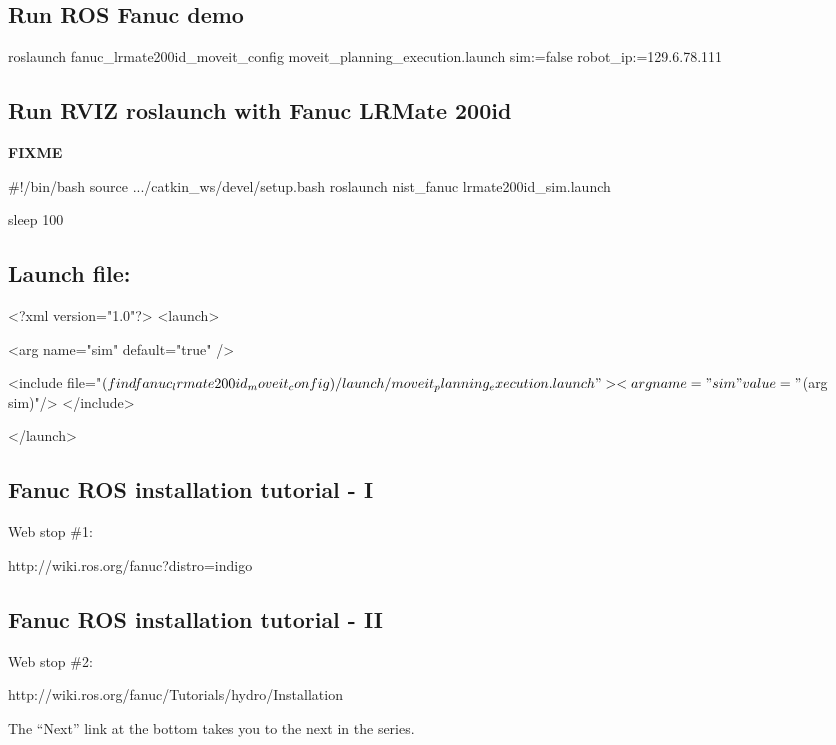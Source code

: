 \subsection*{Run R\-O\-S Fanuc demo }

\begin{DoxyVerb}roslaunch fanuc_lrmate200id_moveit_config  moveit_planning_execution.launch 
    sim:=false   robot_ip:=129.6.78.111
\end{DoxyVerb}


\subsection*{Run R\-V\-I\-Z roslaunch with Fanuc L\-R\-Mate 200id }

{\bfseries F\-I\-X\-M\-E} \begin{DoxyVerb}#!/bin/bash
source .../catkin_ws/devel/setup.bash
roslaunch nist_fanuc lrmate200id_sim.launch

sleep 100
\end{DoxyVerb}


\subsection*{Launch file\-: }

\begin{DoxyVerb}<?xml version="1.0"?>
<launch>

  <arg name="sim" default="true" />

  <include file="$(find fanuc_lrmate200id_moveit_config)/launch/moveit_planning_execution.launch">
    <arg name="sim" value="$(arg sim)"/>
  </include>

</launch>
\end{DoxyVerb}


\subsection*{Fanuc R\-O\-S installation tutorial -\/ I }

Web stop \#1\-: \begin{DoxyVerb}            http://wiki.ros.org/fanuc?distro=indigo
\end{DoxyVerb}


\subsection*{Fanuc R\-O\-S installation tutorial -\/ I\-I }

Web stop \#2\-: \begin{DoxyVerb}            http://wiki.ros.org/fanuc/Tutorials/hydro/Installation
\end{DoxyVerb}


The “\-Next” link at the bottom takes you to the next in the series. 